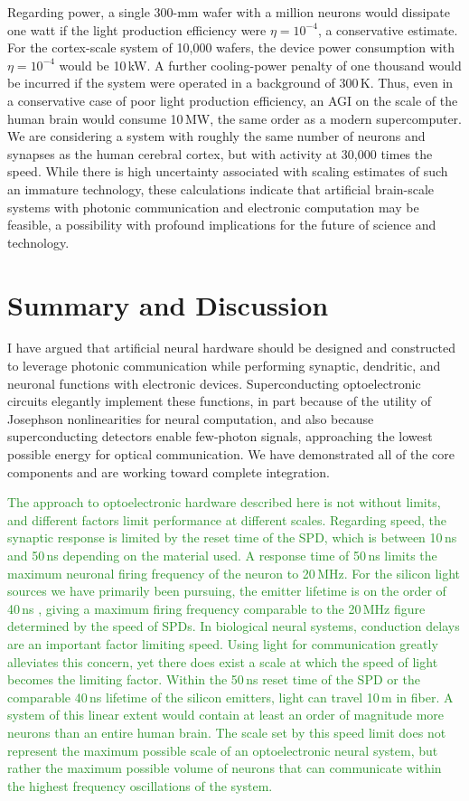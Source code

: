 \documentclass[twocolumn]{article}
\begin{document}
Regarding power, a single 300-mm wafer with a million neurons would dissipate one watt if the light production efficiency were $\eta = 10^{-4}$, a conservative estimate. For the cortex-scale system of 10,000 wafers, the device power consumption with $\eta = 10^{-4}$ would be 10\,kW. A further cooling-power penalty of one thousand would be incurred if the system were operated in a background of 300\,K. Thus, even in a conservative case of poor light production efficiency, an AGI on the scale of the human brain would consume 10\,MW, the same order as a modern supercomputer. We are considering a system with roughly the same number of neurons and synapses as the human cerebral cortex, but with activity at 30,000 times the speed. While there is high uncertainty associated with scaling estimates of such an immature technology, these calculations indicate that artificial brain-scale systems with photonic communication and electronic computation may be feasible, a possibility with profound implications for the future of science and technology. 

\section{\label{sec:discussion}Summary and Discussion}
I have argued that artificial neural hardware should be designed and constructed to leverage photonic communication while performing synaptic, dendritic, and neuronal functions with electronic devices. Superconducting optoelectronic circuits elegantly implement these functions, in part because of the utility of Josephson nonlinearities for neural computation, and also because superconducting detectors enable few-photon signals, approaching the lowest possible energy for optical communication. We have demonstrated all of the core components and are working toward complete integration.

\textcolor{ForestGreen}{The approach to optoelectronic hardware described here is not without limits, and different factors limit performance at different scales. Regarding speed, the synaptic response is limited by the reset time of the SPD, which is between 10\,ns and 50\,ns depending on the material used. A response time of 50\,ns limits the maximum neuronal firing frequency of the neuron to 20\,MHz. For the silicon light sources we have primarily been pursuing, the emitter lifetime is on the order of 40\,ns \cite{buta2020}, giving a maximum firing frequency comparable to the 20\,MHz figure determined by the speed of SPDs. In biological neural systems, conduction delays are an important factor limiting speed. Using light for communication greatly alleviates this concern, yet there does exist a scale at which the speed of light becomes the limiting factor. Within the 50\,ns reset time of the SPD or the comparable 40\,ns lifetime of the silicon emitters, light can travel 10\,m in fiber. A system of this linear extent would contain at least an order of magnitude more neurons than an entire human brain. The scale set by this speed limit does not represent the maximum possible scale of an optoelectronic neural system, but rather the maximum possible volume of neurons that can communicate within the highest frequency oscillations of the system.}
\end{document}
